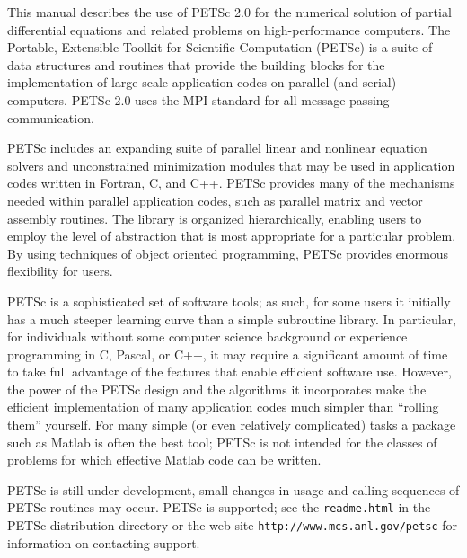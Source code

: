 
%
%

\medskip \medskip
This manual describes the use of PETSc 2.0 for the numerical solution
of partial differential equations and related problems 
on high-performance computers.  The
Portable, Extensible Toolkit for Scientific Computation (PETSc) is a
suite of data structures and routines that provide the building
blocks for the implementation of large-scale application codes on parallel
(and serial) computers.  PETSc 2.0 uses the MPI standard for all
message-passing communication.

PETSc includes an expanding suite of parallel linear and nonlinear
equation solvers and unconstrained minimization modules that may be
used in application codes written in Fortran, C, and C++.  PETSc
provides many of the mechanisms needed within parallel application
codes, such as parallel matrix and vector assembly routines. The library is
organized hierarchically, enabling users to employ the level of
abstraction that is most appropriate for a particular problem. By
using techniques of object oriented programming, PETSc provides
enormous flexibility for users.

PETSc is a sophisticated set of software tools; as such, for some
users it initially has a much steeper learning curve than a
simple subroutine library. In particular, for individuals without some
computer science background or experience programming in C,
Pascal, or C++, it may require a significant amount of time to take full
advantage of the features that enable efficient software use.
However, the power of the PETSc design and
the algorithms it incorporates make the efficient implementation of
many application codes much simpler than ``rolling them'' yourself.
For many simple (or even relatively complicated) tasks a package such as
Matlab is often the best tool; PETSc is not intended for the classes
of problems for which effective Matlab code can be written.

PETSc is still under development, small changes in usage and
calling sequences of PETSc routines may occur.  PETSc is supported; see the
{\tt readme.html} in the PETSc distribution directory or the web site
{\tt http://www.mcs.anl.gov/petsc} for information on contacting support.

\medskip \medskip


\medskip

